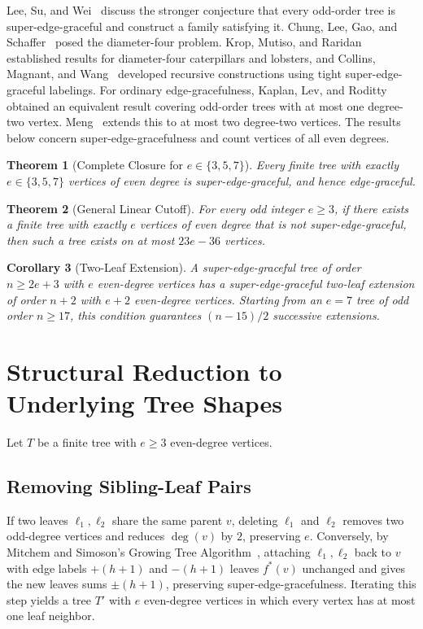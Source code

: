 \documentclass[11pt]{article}
\newtheorem{theorem}{Theorem}
\newtheorem{corollary}[theorem]{Corollary}
\theoremstyle{definition}
\begin{document}
Lee, Su, and Wei~\cite{LeeSuWei} discuss the stronger conjecture that every odd-order tree is super-edge-graceful and construct a family satisfying it. Chung, Lee, Gao, and Schaffer~\cite{Chung2006} posed the diameter-four problem. Krop, Mutiso, and Raridan~\cite{Krop2011} established results for diameter-four caterpillars and lobsters, and Collins, Magnant, and Wang~\cite{Collins2015} developed recursive constructions using tight super-edge-graceful labelings. For ordinary edge-gracefulness, Kaplan, Lev, and Roditty~\cite{Kaplan2009} obtained an equivalent result covering odd-order trees with at most one degree-two vertex. Meng~\cite{Meng2026} extends this to at most two degree-two vertices. The results below concern super-edge-gracefulness and count vertices of all even degrees.

\begin{theorem}[Complete Closure for $e \in \{3, 5, 7\}$]\label{thm:main}
Every finite tree with exactly $e \in \{3, 5, 7\}$ vertices of even degree is super-edge-graceful, and hence edge-graceful.
\end{theorem}

\begin{theorem}[General Linear Cutoff]\label{thm:cutoff}
For every odd integer $e \ge 3$, if there exists a finite tree with exactly $e$ vertices of even degree that is not super-edge-graceful, then such a tree exists on at most $23e - 36$ vertices.
\end{theorem}

\begin{corollary}[Two-Leaf Extension]\label{cor:inf}
A super-edge-graceful tree of order $n \ge 2e+3$ with $e$ even-degree vertices has a super-edge-graceful two-leaf extension of order $n+2$ with $e+2$ even-degree vertices. Starting from an $e=7$ tree of odd order $n \ge 17$, this condition guarantees $(n-15)/2$ successive extensions.
\end{corollary}

\section{Structural Reduction to Underlying Tree Shapes}

Let $T$ be a finite tree with $e \ge 3$ even-degree vertices.

\subsection{Removing Sibling-Leaf Pairs}
If two leaves $\ell_1, \ell_2$ share the same parent $v$, deleting $\ell_1$ and $\ell_2$ removes two odd-degree vertices and reduces $\deg(v)$ by $2$, preserving $e$. Conversely, by Mitchem and Simoson's Growing Tree Algorithm~\cite{MitchemSimoson1994}, attaching $\ell_1, \ell_2$ back to $v$ with edge labels $+(h+1)$ and $-(h+1)$ leaves $f^*(v)$ unchanged and gives the new leaves sums $\pm(h+1)$, preserving super-edge-gracefulness. Iterating this step yields a tree $T'$ with $e$ even-degree vertices in which every vertex has at most one leaf neighbor.
\end{document}
